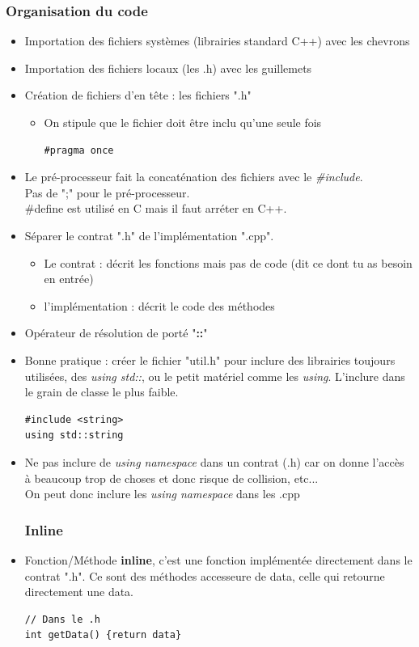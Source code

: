 \documentclass[12pt,a4paper]{article}
\begin{document}
\subsubsection{Organisation du code}
\begin{itemize}
\item Importation des fichiers systèmes (librairies standard C++) avec les chevrons
\item Importation des fichiers locaux (les .h) avec les guillemets
\item Création de fichiers d'en tête : les fichiers ".h"
\begin{itemize}
\item On stipule que le fichier doit être inclu qu'une seule fois
\begin{lstlisting}
#pragma once
\end{lstlisting}
\end{itemize}
\item Le pré-processeur fait la concaténation des fichiers avec le \textit{\#include}.\\
Pas de ";" pour le pré-processeur.\\
\#define est utilisé en C mais il faut arréter en C++.
\item Séparer le contrat ".h" de l'implémentation ".cpp".
\begin{itemize}
\item Le contrat : décrit les fonctions mais pas de code (dit ce dont tu as besoin en entrée)
\item l'implémentation : décrit le code des méthodes
\end{itemize}
\item Opérateur de résolution de porté "\textbf{::}"
\item Bonne pratique : créer le fichier "util.h" pour inclure des librairies toujours utilisées, des \textit{using std::}, ou le petit matériel comme les \textit{using}. L'inclure dans le grain de classe le plus faible.
\begin{lstlisting}
#include <string>
using std::string
\end{lstlisting}
\item Ne pas inclure de \textit{using namespace} dans un contrat (.h) car on donne l'accès à beaucoup trop de choses et donc risque de collision, etc...\\
On peut donc inclure les \textit{using namespace} dans les .cpp
\subsubsection{Inline}
\item Fonction/Méthode \textbf{inline}, c'est une fonction implémentée directement dans le contrat ".h". Ce sont des méthodes accesseure de data, celle qui retourne directement une data.
\begin{lstlisting}
// Dans le .h
int getData() {return data}


\end{lstlisting}
\end{itemize}
\end{document}

